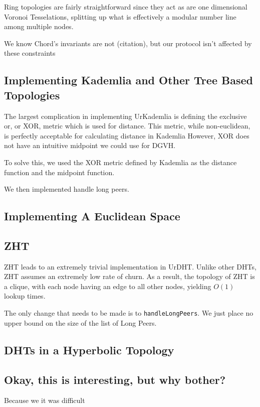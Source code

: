 \documentclass[11pt,conference]{IEEEtran}
\begin{document}
Ring topologies are fairly straightforward since they act as are one dimensional Voronoi Tesselations, splitting up what is effectively a modular number line among multiple nodes.

We know Chord's invariants are not (citation), but our protocol isn't affected by these constraints


\subsection{Implementing Kademlia and Other Tree Based Topologies}
The largest complication in implementing UrKademlia is defining the exclusive or, or XOR, metric which is used for distance.
This metric, while non-euclidean, is perfectly acceptable for calculating distance in Kademlia \cite{kademlia}
However, XOR does not have an intuitive midpoint we could use for DGVH.

To solve this, we used the XOR metric defined by Kademlia as the distance function and the midpoint function.



We then implemented handle long peers.

\subsection{Implementing A Euclidean Space}


\subsection{ZHT}
ZHT \cite{li2013zht} leads to an extremely trivial implementation in UrDHT.
Unlike other DHTs, ZHT assumes an extremely low rate of churn.
As a result, the topology of ZHT is a clique, with each node having an edge to all other nodes, yielding $ O(1) $ lookup times.

The only change that needs to be made is to \texttt{handleLongPeers}.
We just place no upper bound on the size of the list of Long Peers.
\subsection{DHTs in a Hyperbolic Topology}
	
\label{sec:hyper}
	

	
	
	
	\subsection{Okay, this is interesting, but why bother?}
	Because we it was difficult
	
\end{document}
